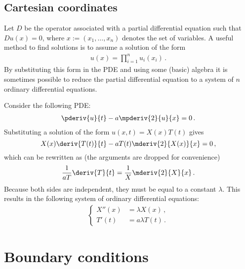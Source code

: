 \subsection{Cartesian coordinates}

    \begin{method}
        Let $D$ be the operator associated with a partial differential equation such that $Du(x)=0$, where $x:=(x_1,\ldots,x_n)$ denotes the set of variables. A useful method to find solutions is to assume a solution of the form
        \begin{gather}
            u(x) = \prod_{i=1}^nu_i(x_i)\,.
        \end{gather}
        By substituting this form in the PDE and using some (basic) algebra it is sometimes possible to reduce the partial differential equation to a system of $n$ ordinary differential equations.
    \end{method}

    \begin{example}
        Consider the following PDE:
        \begin{gather}
            \pderiv{u}{t} - a\mpderiv{2}{u}{x} = 0\,.
        \end{gather}
        Substituting a solution of the form $u(x,t) = X(x)T(t)$ gives \[X(x)\deriv{T(t)}{t} - aT(t)\mderiv{2}{X(x)}{x} = 0\,,\] which can be rewritten as (the arguments are dropped for convenience) \[\frac{1}{aT}\deriv{T}{t} = \frac{1}{X}\mderiv{2}{X}{x}\,.\] Because both sides are independent, they must be equal to a constant $\lambda$. This results in the following system of ordinary differential equations:
        \begin{gather}
            \begin{cases}
                X''(x) &= \lambda X(x)\,,\\
                T'(t) &= a\lambda T(t)\,.
            \end{cases}
        \end{gather}
    \end{example}

\section{Boundary conditions}



